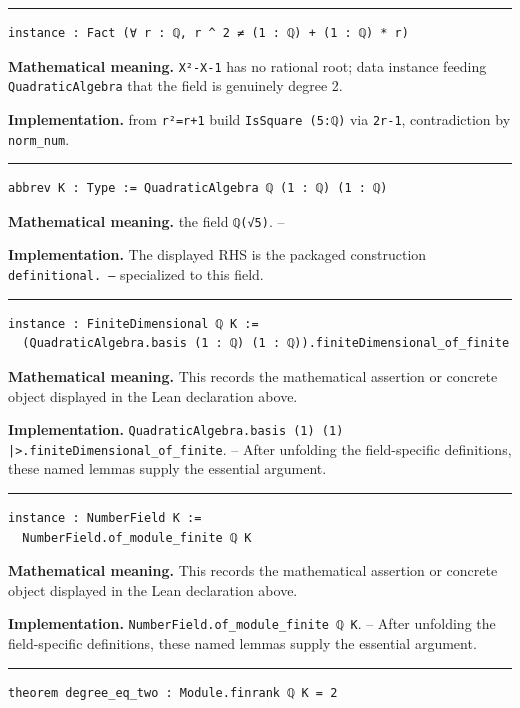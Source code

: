 \documentclass[UTF8,a4paper,11pt,fontset=fandol]{ctexart}
\theoremstyle{definition}
\newcommand{\statementsep}{\par\medskip\hrule\medskip}
\begin{document}
\statementsep
\begin{verbatim}
instance : Fact (∀ r : ℚ, r ^ 2 ≠ (1 : ℚ) + (1 : ℚ) * r)
\end{verbatim}
\noindent\textbf{Mathematical meaning.} \texttt{X²-X-1} has no rational root; data instance feeding \texttt{QuadraticAlgebra} that the field is genuinely degree 2.\par
\noindent\textbf{Implementation.} from \texttt{r²=r+1} build \texttt{IsSquare (5:ℚ)} via \texttt{2r-1}, contradiction by \texttt{norm\_\allowbreak{}num}.\par
\statementsep
\begin{verbatim}
abbrev K : Type := QuadraticAlgebra ℚ (1 : ℚ) (1 : ℚ)
\end{verbatim}
\noindent\textbf{Mathematical meaning.} the field \texttt{ℚ(√5)}. --\par
\noindent\textbf{Implementation.} The displayed RHS is the packaged construction \texttt{definitional.\allowbreak{} --} specialized to this field.\par
\statementsep
\begin{verbatim}
instance : FiniteDimensional ℚ K :=
  (QuadraticAlgebra.basis (1 : ℚ) (1 : ℚ)).finiteDimensional_of_finite
\end{verbatim}
\noindent\textbf{Mathematical meaning.} This records the mathematical assertion or concrete object displayed in the Lean declaration above.\par
\noindent\textbf{Implementation.} \texttt{QuadraticAlgebra.\allowbreak{}basis (1) (1) |>.\allowbreak{}finiteDimensional\_\allowbreak{}of\_\allowbreak{}finite}. -- After unfolding the field-specific definitions, these named lemmas supply the essential argument.\par
\statementsep
\begin{verbatim}
instance : NumberField K :=
  NumberField.of_module_finite ℚ K
\end{verbatim}
\noindent\textbf{Mathematical meaning.} This records the mathematical assertion or concrete object displayed in the Lean declaration above.\par
\noindent\textbf{Implementation.} \texttt{NumberField.\allowbreak{}of\_\allowbreak{}module\_\allowbreak{}finite ℚ K}. -- After unfolding the field-specific definitions, these named lemmas supply the essential argument.\par
\statementsep
\begin{verbatim}
theorem degree_eq_two : Module.finrank ℚ K = 2
\end{verbatim}
\end{document}
